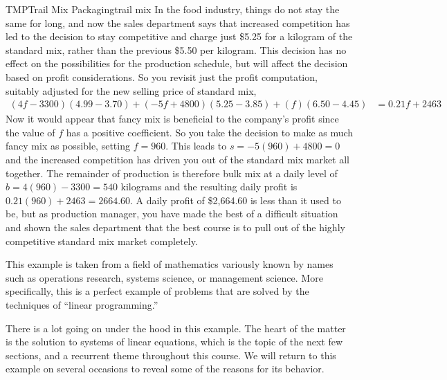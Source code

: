 \begin{example}{TMP}{Trail Mix Packaging}{trail mix}
%
In the food industry, things do not stay the same for long, and now the sales department says that increased competition has led to the decision to stay competitive and charge just \$5.25 for a kilogram of the standard mix, rather than the previous \$5.50 per kilogram.  This decision has no effect on the possibilities for the production schedule, but will affect the decision based on profit considerations.  So you revisit just the profit computation, suitably adjusted for the new selling price of standard mix,
%
\begin{align*}
(4f-3300)(4.99-3.70)+(-5f+4800)(5.25-3.85)+(f)(6.50-4.45)&=0.21f+2463
\end{align*}
%
Now it would appear that fancy mix is beneficial to the company's profit since the value of $f$ has a positive coefficient.  So you take the decision to make as much fancy mix as possible, setting $f=960$.  This leads to $s=-5(960)+4800=0$ and the increased competition has driven you out of the standard mix market all together.  The remainder of production is therefore bulk mix at a daily level of $b=4(960)-3300=540$ kilograms and the resulting daily profit is $0.21(960)+2463=2664.60$.  A daily profit of \$2,664.60 is less than it used to be, but as production manager, you have made the best of a difficult situation and shown the sales department that the best course is to pull out of the highly competitive standard mix market completely.
%
\end{example}
%
This example is taken from a field of mathematics variously known by names such as operations research, systems science, or management science.  More specifically, this is a perfect example of problems that are solved by the techniques of ``linear programming.''\par
%
There is a lot going on under the hood in this example.  The heart of the matter is the solution to systems of linear equations, which is the topic of the next few sections, and a recurrent theme throughout this course.  We will return to this example on several occasions to reveal some of the reasons for its behavior.
%
%
